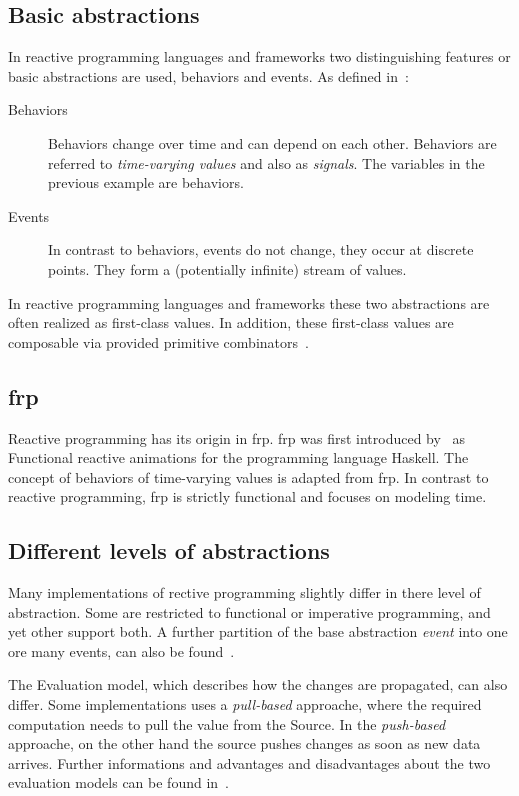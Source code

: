 \documentclass[acmsmall]{acmart}\settopmatter{printfolios=true,printccs=false,printacmref=false}
\begin{document}
	\subsection{Basic abstractions}
	In reactive programming languages and frameworks two distinguishing features or basic abstractions are used, behaviors and events.
	As defined in~\cite{Bainomugisha:2013}:

	\begin{description}
		\item[Behaviors]
		Behaviors change over time and can depend on each other. 
		Behaviors are referred to \textit{time-varying values} and also as \textit{signals}.
		The variables in the previous example are behaviors. 
		\item[Events]
		In contrast to behaviors, events do not change, they occur at discrete points. 
		They form a (potentially infinite) stream of values.
	\end{description}

	In reactive programming languages and frameworks these two abstractions are often realized as first-class values.
	In addition, these first-class values are composable via provided primitive combinators~\cite{Bainomugisha:2013}.

	\subsection{\ac{frp}}
		Reactive programming has its origin in \ac{frp}. 
		\ac{frp} was first introduced by~\cite{Elliott} as Functional reactive animations for the programming language Haskell.
		The concept of behaviors of time-varying values is adapted from \ac{frp}. 
		In contrast to reactive programming, \ac{frp} is strictly functional and focuses on modeling time.

	\subsection{Different levels of abstractions}
		Many implementations of rective programming slightly differ in there level of abstraction.
		Some are restricted to functional or imperative programming, and yet other support both\cite{Maier:2010}.
		A further partition of the base abstraction \textit{event} into one ore many events, 
		can also be found~\cite{reactiveX:2018,projectReactor:2018}.

		The Evaluation model, which describes how the changes are propagated, can also differ.
		Some implementations uses a \textit{pull-based} approache, where the required computation needs to pull the value from the Source.
		In the \textit{push-based} approache, on the other hand the source pushes changes as soon as new data arrives.
		Further informations and advantages and disadvantages about the two evaluation models can be found in~\cite{Bainomugisha:2013}.
\end{document}
